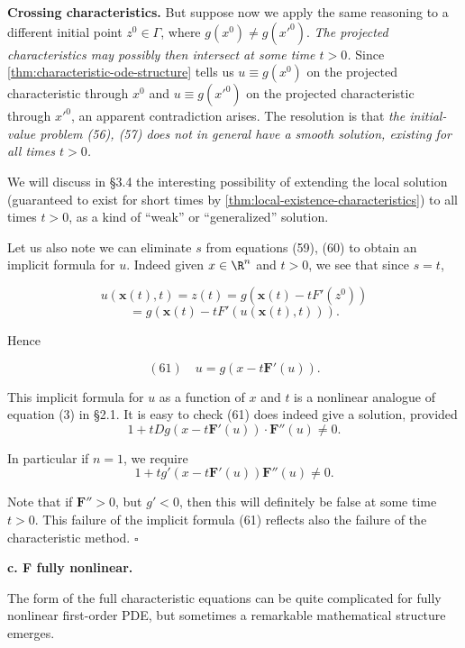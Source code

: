 \begin{example}
\textbf{Crossing characteristics.} But suppose now we apply the same reasoning to a different initial point $z^0 \in \Gamma$, where $g(x^0) \neq g(x'^0)$. \textit{The projected characteristics may possibly then intersect at some time $t > 0$.} Since \cref{thm:characteristic-ode-structure} tells us $u \equiv g(x^0)$ on the projected characteristic through $x^0$ and $u \equiv g(x'^0)$ on the projected characteristic through $x'^0$, an apparent contradiction arises. The resolution is that \textit{the initial-value problem (56), (57) does not in general have a smooth solution, existing for all times $t > 0$.}

We will discuss in \S 3.4 the interesting possibility of extending the local solution (guaranteed to exist for short times by \cref{thm:local-existence-characteristics}) to all times $t > 0$, as a kind of ``weak'' or ``generalized'' solution.
\end{example}

\begin{remark}
\label{rem:implicit-formula-conservation-law}
Let us also note we can eliminate $s$ from equations (59), (60) to obtain an implicit formula for $u$. Indeed given $x \in \R^n$ and $t > 0$, we see that since $s = t$,

$$u(\mathbf{x}(t), t) = z(t) = g(\mathbf{x}(t) - tF'(z^0))$$
$$= g(\mathbf{x}(t) - tF'(u(\mathbf{x}(t), t))).$$

Hence

$$(61) \quad u = g(x - t\mathbf{F}'(u)).$$

This implicit formula for $u$ as a function of $x$ and $t$ is a nonlinear analogue of equation (3) in \S 2.1. It is easy to check (61) does indeed give a solution, provided
$$1 + tDg(x - t\mathbf{F}'(u)) \cdot \mathbf{F}''(u) \neq 0.$$

In particular if $n = 1$, we require
$$1 + tg'(x - t\mathbf{F}'(u))\mathbf{F}''(u) \neq 0.$$

Note that if $\mathbf{F}'' > 0$, but $g' < 0$, then this will definitely be false at some time $t > 0$. This failure of the implicit formula (61) reflects also the failure of the characteristic method. $\square$
\end{remark}

\textbf{c. F fully nonlinear.}

The form of the full characteristic equations can be quite complicated for fully nonlinear first-order PDE, but sometimes a remarkable mathematical structure emerges.

